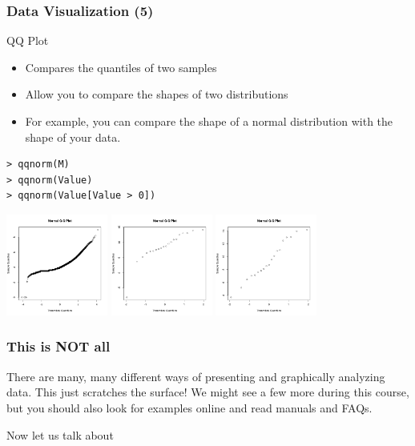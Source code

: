 \documentclass[10pt]{beamer}
\begin{document}
\begin{frame}
  \frametitle{Data Visualization (5)}
  \begin{block}{QQ Plot}
    \begin{itemize}
    \item Compares the quantiles of two samples
    \item Allow you to compare the shapes of two distributions
    \item For example, you can compare the shape of a normal
      distribution with the shape of your data.
    \end{itemize}
  \end{block}
\small{
\begin{verbatim}
> qqnorm(M)
> qqnorm(Value)
> qqnorm(Value[Value > 0])
\end{verbatim}}
\begin{center}
\includegraphics[width=0.25\textwidth]{img/qqplot1}\hspace{0.1\textwidth}
\includegraphics[width=0.25\textwidth]{img/qqplot2}\hspace{0.1\textwidth}
\includegraphics[width=0.25\textwidth]{img/qqplot3}
\end{center}
\end{frame}

\begin{frame}
  \frametitle{This is NOT all}
  \begin{block}{}
    There are many, many different ways of presenting and graphically
    analyzing data. This just scratches the surface! We might see a
    few more during this course, but you should also look for examples
    online and read manuals and FAQs.
  \end{block}

  \begin{block}{}
    Now let us talk about 
  \end{block}
\end{frame}
\end{document}
